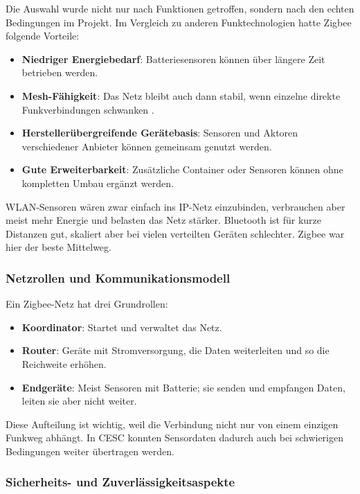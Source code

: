 Die Auswahl wurde nicht nur nach Funktionen getroffen, sondern nach den echten Bedingungen im Projekt. Im Vergleich zu anderen Funktechnologien hatte Zigbee folgende Vorteile:

\begin{itemize}
    \item \textbf{Niedriger Energiebedarf}: Batteriesensoren können über längere Zeit betrieben werden.
    \item \textbf{Mesh-Fähigkeit}: Das Netz bleibt auch dann stabil, wenn einzelne direkte Funkverbindungen schwanken \cite{digi_zigbee_mesh}.
    \item \textbf{Herstellerübergreifende Gerätebasis}: Sensoren und Aktoren verschiedener Anbieter können gemeinsam genutzt werden.
    \item \textbf{Gute Erweiterbarkeit}: Zusätzliche Container oder Sensoren können ohne kompletten Umbau ergänzt werden.
\end{itemize}

WLAN-Sensoren wären zwar einfach ins IP-Netz einzubinden, verbrauchen aber meist mehr Energie und belasten das Netz stärker. Bluetooth ist für kurze Distanzen gut, skaliert aber bei vielen verteilten Geräten schlechter. Zigbee war hier der beste Mittelweg.

\subsubsection{Netzrollen und Kommunikationsmodell}

Ein Zigbee-Netz hat drei Grundrollen:

\begin{itemize}
    \item \textbf{Koordinator}: Startet und verwaltet das Netz.
    \item \textbf{Router}: Geräte mit Stromversorgung, die Daten weiterleiten und so die Reichweite erhöhen.
    \item \textbf{Endgeräte}: Meist Sensoren mit Batterie; sie senden und empfangen Daten, leiten sie aber nicht weiter.
\end{itemize}

Diese Aufteilung ist wichtig, weil die Verbindung nicht nur von einem einzigen Funkweg abhängt. In CESC konnten Sensordaten dadurch auch bei schwierigen Bedingungen weiter übertragen werden.

\subsubsection{Sicherheits- und Zuverlässigkeitsaspekte}

